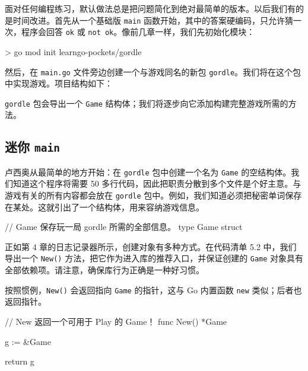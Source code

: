面对任何编程练习，默认做法总是把问题简化到绝对最简单的版本。以后我们有的是时间改进。首先从一个基础版 \texttt{main} 函数开始，其中的答案硬编码，只允许猜一次，程序会回答 \texttt{ok} 或 \texttt{not ok}。像前几章一样，我们先初始化模块：

\begin{shellcode}[]
> go mod init learngo-pockets/gordle
\end{shellcode}

然后，在 \texttt{main.go} 文件旁边创建一个与游戏同名的新包 \texttt{gordle}。我们将在这个包中实现游戏。项目结构如下：

\begin{treebox}
\end{treebox}

\texttt{gordle} 包会导出一个 \texttt{Game} 结构体；我们将逐步向它添加构建完整游戏所需的方法。

\subsection{迷你 \texttt{main}}

卢西奥从最简单的地方开始：在 \texttt{gordle} 包中创建一个名为 \texttt{Game} 的空结构体。我们知道这个程序将需要 50 多行代码，因此把职责分散到多个文件是个好主意。与游戏有关的所有内容都会放在 \texttt{gordle} 包中。例如，我们知道必须把秘密单词保存在某处。这就引出了一个结构体，用来容纳游戏信息。

\begin{gocode}[title={代码清单 5.1 \texttt{game.go}：\texttt{Game} 结构体}]
// Game 保存玩一局 gordle 所需的全部信息。
type Game struct{}
\end{gocode}

正如第 4 章的日志记录器所示，创建对象有多种方式。在代码清单 5.2 中，我们导出一个 \texttt{New()} 方法，把它作为进入库的推荐入口，并保证创建的 \texttt{Game} 对象具有全部依赖项。请注意，确保库行为正确是一种好习惯。

按照惯例，\texttt{New()} 会返回指向 \texttt{Game} 的指针，这与 Go 内置函数 \texttt{new} 类似；后者也返回指针。

\begin{gocode}[title={代码清单 5.2 \texttt{game.go}：使用 \texttt{New} 创建 \texttt{Game} 结构体}]
// New 返回一个可用于 Play 的 Game！
func New() *Game {
    g := &Game{}

    return g
}
\end{gocode}

